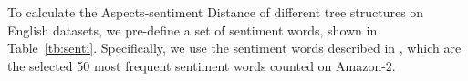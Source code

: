 \documentclass[11pt]{article}
\begin{document}
To calculate the Aspects-sentiment Distance of different tree structures on English datasets, we pre-define a set of sentiment words, shown in Table~\ref{tb:senti}. Specifically, we use the sentiment words described in \citet{DBLP:conf/acl/TianGXLHWWW20}, which are the selected 50 most frequent sentiment words counted on Amazon-2.
\end{document}
